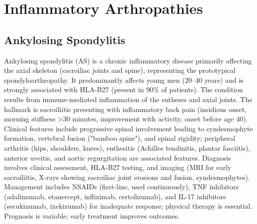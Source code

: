 \section{Inflammatory Arthropathies}








\label{sec:Inflammatory Arthropathies}

\subsection{Ankylosing Spondylitis}
\label{sec:Ankylosing Spondylitis}
Ankylosing spondylitis (AS) is a chronic inflammatory disease primarily affecting the axial skeleton (sacroiliac joints and spine), representing the prototypical spondyloarthropathy. It predominantly affects young men (20--40 years) and is strongly associated with HLA-B27 (present in 90\% of patients). The condition results from immune-mediated inflammation of the entheses and axial joints. The hallmark is sacroiliitis presenting with inflammatory back pain (insidious onset, morning stiffness >30 minutes, improvement with activity, onset before age 40). Clinical features include progressive spinal involvement leading to syndesmophyte formation, vertebral fusion ("bamboo spine"), and spinal rigidity; peripheral arthritis (hips, shoulders, knees), enthesitis (Achilles tendinitis, plantar fasciitis), anterior uveitis, and aortic regurgitation are associated features. Diagnosis involves clinical assessment, HLA-B27 testing, and imaging (MRI for early sacroiliitis, X-rays showing sacroiliac joint erosions and fusion, syndesmophytes). Management includes NSAIDs (first-line, used continuously), TNF inhibitors (adalimumab, etanercept, infliximab, certolizumab), and IL-17 inhibitors (secukinumab, ixekizumab) for inadequate response; physical therapy is essential. Prognosis is variable; early treatment improves outcomes.

